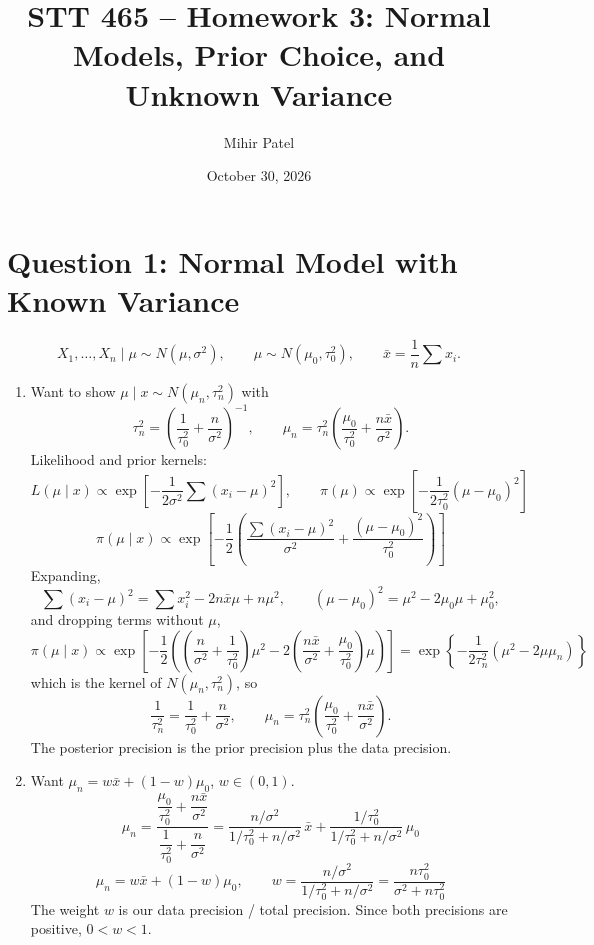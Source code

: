 \documentclass[11pt]{article}
\title{STT 465 -- Homework 3: Normal Models, Prior Choice, and Unknown Variance}
\author{Mihir Patel}
\date{October 30, 2026}
\begin{document}
\maketitle

\section*{Question 1: Normal Model with Known Variance}

\[
X_1,\dots,X_n \mid \mu \sim N(\mu, \sigma^2), \qquad \mu \sim N(\mu_0, \tau_0^2), \qquad \bar{x} = \frac{1}{n}\sum x_i.
\]

\begin{enumerate}
\item Want to show $\mu \mid x \sim N(\mu_n, \tau_n^2)$ with
\[
\tau_n^2 = \left(\frac{1}{\tau_0^2} + \frac{n}{\sigma^2}\right)^{-1}, \qquad
\mu_n = \tau_n^2\left(\frac{\mu_0}{\tau_0^2} + \frac{n\bar{x}}{\sigma^2}\right).
\]
Likelihood and prior kernels:
\[
L(\mu \mid x) \propto \exp\left[-\frac{1}{2\sigma^2}\sum (x_i - \mu)^2\right], \qquad
\pi(\mu) \propto \exp\left[-\frac{1}{2\tau_0^2}(\mu - \mu_0)^2\right]
\]
\[
\pi(\mu \mid x) \propto \exp\left[-\frac{1}{2}\left(\frac{\sum (x_i-\mu)^2}{\sigma^2} + \frac{(\mu-\mu_0)^2}{\tau_0^2}\right)\right]
\]
Expanding,
\[
\sum (x_i - \mu)^2 = \sum x_i^2 - 2n\bar{x}\mu + n\mu^2, \qquad
(\mu - \mu_0)^2 = \mu^2 - 2\mu_0\mu + \mu_0^2,
\]
and dropping terms without $\mu$,
\[
\pi(\mu \mid x) \propto \exp\left[-\frac{1}{2}\left(\left(\frac{n}{\sigma^2} + \frac{1}{\tau_0^2}\right)\mu^2 - 2\left(\frac{n\bar{x}}{\sigma^2} + \frac{\mu_0}{\tau_0^2}\right)\mu\right)\right]
= \exp\left\{-\frac{1}{2\tau_n^2}\left(\mu^2 - 2\mu\mu_n\right)\right\}
\]
which is the kernel of $N(\mu_n, \tau_n^2)$, so
\[
\boxed{\frac{1}{\tau_n^2} = \frac{1}{\tau_0^2} + \frac{n}{\sigma^2}}, \qquad
\mu_n = \tau_n^2\left(\frac{\mu_0}{\tau_0^2} + \frac{n\bar{x}}{\sigma^2}\right).
\]
The posterior precision is the prior precision plus the data precision.

\item Want $\mu_n = w\bar{x} + (1-w)\mu_0$, $w \in (0,1)$.
\[
\mu_n = \frac{\dfrac{\mu_0}{\tau_0^2} + \dfrac{n\bar{x}}{\sigma^2}}{\dfrac{1}{\tau_0^2} + \dfrac{n}{\sigma^2}}
= \frac{n/\sigma^2}{1/\tau_0^2 + n/\sigma^2}\,\bar{x} + \frac{1/\tau_0^2}{1/\tau_0^2 + n/\sigma^2}\,\mu_0
\]
\[
\boxed{\mu_n = w\bar{x} + (1-w)\mu_0}, \qquad
\boxed{w = \frac{n/\sigma^2}{1/\tau_0^2 + n/\sigma^2} = \frac{n\tau_0^2}{\sigma^2 + n\tau_0^2}}
\]
The weight $w$ is our data precision / total precision. Since both precisions are positive, $0 < w < 1$.


\end{enumerate}
\end{document}
